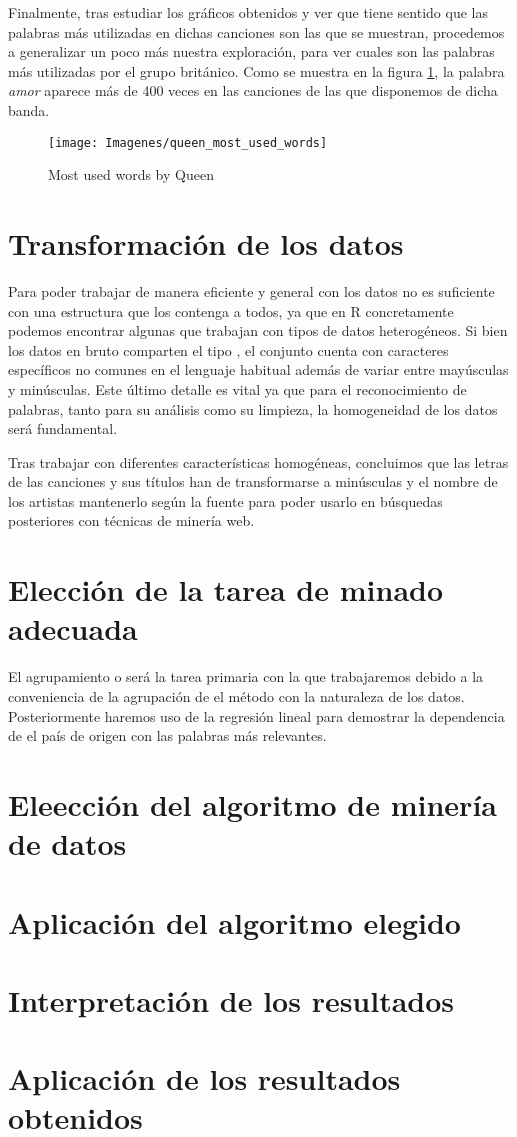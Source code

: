 Finalmente, tras estudiar los gráficos obtenidos y ver que tiene sentido que las palabras más utilizadas en dichas canciones son las que se muestran, procedemos a generalizar un poco más nuestra exploración, para ver cuales son las palabras más utilizadas por el grupo británico. Como se muestra en la figura \ref{fig:queen_songs}, la palabra \textit{amor} aparece más de 400 veces en las canciones de las que disponemos de dicha banda.
\begin{figure}[h]
	\centering
	\texttt{[image: Imagenes/queen\_most\_used\_words]}
	\caption{Most used words by Queen}
	\label{fig:queen_songs}
\end{figure}

\section{Transformación de los datos}
Para poder trabajar de manera eficiente y general con los datos no es suficiente con una estructura que los contenga a todos, ya que en R concretamente podemos encontrar algunas que trabajan con tipos de datos heterogéneos. Si bien los datos en bruto comparten el tipo , el conjunto cuenta con caracteres específicos no comunes en el lenguaje habitual además de variar entre mayúsculas y minúsculas. Este último detalle es vital ya que para el reconocimiento de palabras, tanto para su análisis como su limpieza, la homogeneidad de los datos será fundamental.

Tras trabajar con diferentes características homogéneas, concluimos que las letras de las canciones y sus títulos han de transformarse a minúsculas y el nombre de los artistas mantenerlo según la fuente para poder usarlo en búsquedas posteriores con técnicas de minería web.
\section{Elección de la tarea de minado adecuada}
El agrupamiento o  será la tarea primaria con la que trabajaremos debido a la conveniencia de la agrupación de el método con la naturaleza de los datos. Posteriormente haremos uso de la regresión lineal para demostrar la dependencia de el país de origen con las palabras más relevantes.
\section{Eleección del algoritmo de minería de datos}
\section{Aplicación del algoritmo elegido}
\section{Interpretación de los resultados}
\section{Aplicación de los resultados obtenidos}